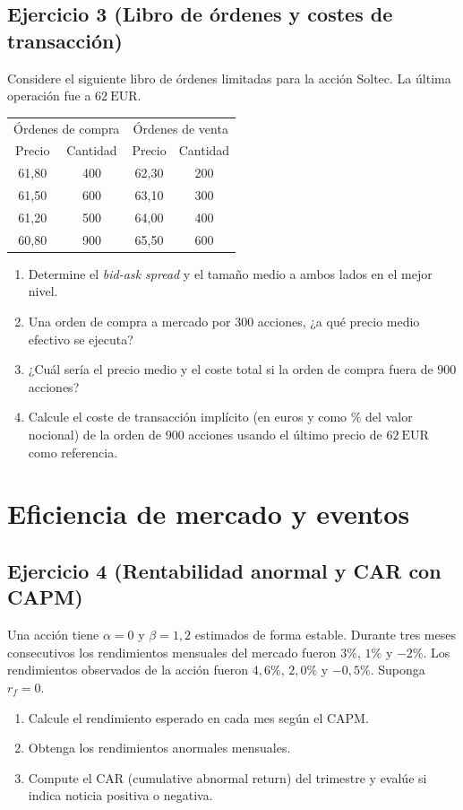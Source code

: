 \documentclass[12pt,a4paper]{article}
\newcommand{\EUR}[1]{\ensuremath{#1~\text{EUR}}}
\newenvironment{ejercicio}[1]{\subsection*{Ejercicio #1}}{}
\begin{document}
\begin{ejercicio}{3 (Libro de órdenes y costes de transacción)}
Considere el siguiente libro de órdenes limitadas para la acción Soltec. La última operación fue a \EUR{62}.
\begin{center}
\begin{tabular}{cc|cc}
\toprule
\multicolumn{2}{c|}{Órdenes de compra} & \multicolumn{2}{c}{Órdenes de venta} \\
Precio & Cantidad & Precio & Cantidad\\
\midrule
61{,}80 & 400 & 62{,}30 & 200\\
61{,}50 & 600 & 63{,}10 & 300\\
61{,}20 & 500 & 64{,}00 & 400\\
60{,}80 & 900 & 65{,}50 & 600\\
\bottomrule
\end{tabular}
\end{center}
\begin{enumerate}[label=\alph*)]
  \item Determine el \emph{bid-ask spread} y el tamaño medio a ambos lados en el mejor nivel.
  \item Una orden de compra a mercado por \(300\) acciones, ¿a qué precio medio efectivo se ejecuta?
  \item ¿Cuál sería el precio medio y el coste total si la orden de compra fuera de \(900\) acciones?
  \item Calcule el coste de transacción implícito (en euros y como \% del valor nocional) de la orden de \(900\) acciones usando el último precio de \EUR{62} como referencia.
\end{enumerate}
\end{ejercicio}

\section{Eficiencia de mercado y eventos}

\begin{ejercicio}{4 (Rentabilidad anormal y CAR con CAPM)}
Una acción tiene \(\alpha=0\) y \(\beta=1{,}2\) estimados de forma estable. Durante tres meses consecutivos los rendimientos mensuales del mercado fueron \(3\%\), \(1\%\) y \(-2\%\). Los rendimientos observados de la acción fueron \(4{,}6\%\), \(2{,}0\%\) y \(-0{,}5\%\). Suponga \(r_f=0\).
\begin{enumerate}[label=\alph*)]
  \item Calcule el rendimiento esperado en cada mes según el CAPM.
  \item Obtenga los rendimientos anormales mensuales.
  \item Compute el CAR (cumulative abnormal return) del trimestre y evalúe si indica noticia positiva o negativa.
\end{enumerate}
\end{ejercicio}
\end{document}
